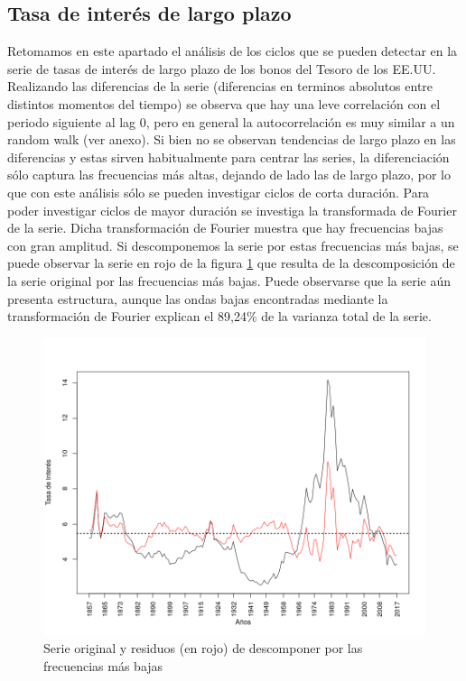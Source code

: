 \documentclass[a4paper]{article}
\begin{document}
\subsection{Tasa de interés de largo plazo}
Retomamos en este apartado el análisis de los ciclos que se pueden detectar en la serie de tasas de interés de largo plazo de los bonos del Tesoro de los EE.UU.
Realizando las diferencias de la serie (diferencias en terminos absolutos entre distintos momentos del tiempo) se observa que hay una leve correlación con el periodo siguiente al lag 0, pero en general la autocorrelación es muy similar a un random walk (ver anexo). Si bien no se observan tendencias de largo plazo en las diferencias y estas sirven habitualmente para centrar las series, la diferenciación sólo captura las frecuencias más altas, dejando de lado las de largo plazo, por lo que con este análisis sólo se pueden investigar ciclos de corta duración. Para poder investigar ciclos de mayor duración se investiga la transformada de Fourier de la serie. 
Dicha transformación de Fourier muestra que hay frecuencias bajas con gran amplitud. Si descomponemos la serie por estas frecuencias más bajas, se puede observar la serie en rojo de la figura \ref{fig:ir_orig_resid} que resulta de la descomposición de la serie original por las frecuencias más bajas. Puede observarse que la serie aún presenta estructura, aunque las ondas bajas encontradas mediante la transformación de Fourier explican el 89,24\% de la varianza total de la serie.

\begin{figure}[H]
	\centering
	\includegraphics[width=0.8\linewidth]{ir_orig_resid.png}
	\caption{Serie original y residuos (en rojo) de descomponer por las frecuencias más bajas} 	
	\label{fig:ir_orig_resid}
\end{figure}
\end{document}
